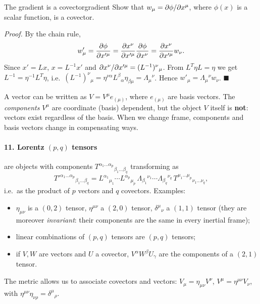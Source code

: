 \begin{example}{The gradient is a covector}{gradient}
Show that $w_\mu=\partial\phi/\partial x^\mu$, where $\phi(x)$ is a scalar function, is a covector.

\textit{Proof.} By the chain rule,
\[
  w'_\mu=\frac{\partial\phi}{\partial x'^\mu}=\frac{\partial x^\nu}{\partial x'^\mu}\frac{\partial\phi}{\partial x^\nu}=\frac{\partial x^\nu}{\partial x'^\mu}w_\nu .
\]
Since $x'=Lx$, $x=L^{-1}x'$ and $\partial x^\nu/\partial x'^\mu=(L^{-1})^\nu{}_\mu$. From $L^T\eta L=\eta$ we get $L^{-1}=\eta^{-1}L^T\eta$, i.e.\ $(L^{-1})^\nu{}_\mu=\eta^{\nu\alpha}L^\beta{}_\alpha\eta_{\beta\mu}=\Lambda_\mu{}^\nu$. Hence $w'_\mu=\Lambda_\mu{}^\nu w_\nu$. $\blacksquare$
\end{example}

\begin{remarkbox}
A vector can be written as $V=V^\mu e_{(\mu)}$, where $e_{(\mu)}$ are basis vectors. The \emph{components} $V^\mu$ are coordinate (basis) dependent, but the object $V$ itself is \textbf{not}: vectors exist regardless of the basis. When we change frame, components and basis vectors change in compensating ways.
\end{remarkbox}

\paragraph{11. Lorentz $(p,q)$ tensors} are objects with components $T^{\alpha_1\dots\alpha_p}{}_{\beta_1\dots\beta_q}$ transforming as
\begin{equation}
  T'^{\alpha_1\dots\alpha_p}{}_{\beta_1\dots\beta_q}=
  L^{\alpha_1}{}_{\mu_1}\cdots L^{\alpha_p}{}_{\mu_p}\,
  \Lambda_{\beta_1}{}^{\nu_1}\cdots\Lambda_{\beta_q}{}^{\nu_q}\,
  T^{\mu_1\dots\mu_p}{}_{\nu_1\dots\nu_q},
\end{equation}
i.e.\ as the product of $p$ vectors and $q$ covectors. Examples:
\begin{itemize}[nosep]
  \item $\eta_{\mu\nu}$ is a $(0,2)$ tensor, $\eta^{\mu\nu}$ a $(2,0)$ tensor, $\delta^\mu{}_\nu$ a $(1,1)$ tensor (they are moreover \emph{invariant}: their components are the same in every inertial frame);
  \item linear combinations of $(p,q)$ tensors are $(p,q)$ tensors;
  \item if $V,W$ are vectors and $U$ a covector, $V^\alpha W^\beta U_\gamma$ are the components of a $(2,1)$ tensor.
\end{itemize}
The metric allows us to associate covectors and vectors: $V_\mu=\eta_{\mu\nu}V^\nu$, $V^\mu=\eta^{\mu\nu}V_\nu$, with $\eta^{\mu\nu}\eta_{\nu\rho}=\delta^\mu{}_\rho$.

